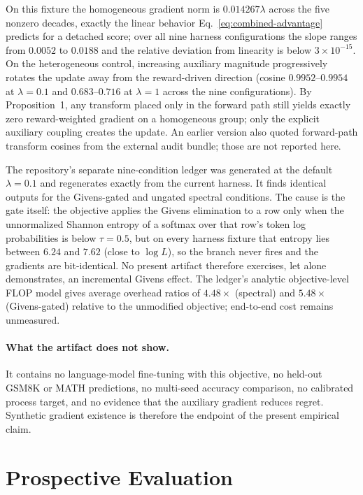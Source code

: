 \documentclass{article}
\begin{document}
On this fixture the homogeneous gradient norm is $0.014267\lambda$ across the
five nonzero decades, exactly the linear behavior
Eq.~\eqref{eq:combined-advantage} predicts for a detached score; over all nine
harness configurations the slope ranges from $0.0052$ to $0.0188$ and the
relative deviation from linearity is below $3\times10^{-15}$.  On the
heterogeneous control, increasing auxiliary magnitude progressively rotates
the update away from the reward-driven direction (cosine $0.9952$--$0.9954$ at
$\lambda=0.1$ and $0.683$--$0.716$ at $\lambda=1$ across the nine
configurations).  By Proposition~1, any transform placed only in the forward
path still yields exactly zero reward-weighted gradient on a homogeneous group;
only the explicit auxiliary coupling creates the update.  An earlier version
also quoted forward-path transform cosines from the external audit bundle;
those are not reported here.

The repository's separate nine-condition ledger was generated at the default
$\lambda=0.1$ and regenerates exactly from the current harness.  It finds
identical outputs for the Givens-gated and ungated spectral conditions.  The
cause is the gate itself: the objective applies the Givens elimination to a row
only when the unnormalized Shannon entropy of a softmax over that row's token
log probabilities is below $\tau=0.5$, but on every harness fixture that
entropy lies between $6.24$ and $7.62$ (close to $\log L$), so the branch
never fires and the gradients are bit-identical.  No present artifact
therefore exercises, let alone demonstrates, an incremental Givens effect.
The ledger's analytic objective-level FLOP model gives average overhead ratios
of $4.48\times$ (spectral) and $5.48\times$ (Givens-gated) relative to the
unmodified objective; end-to-end cost remains unmeasured.

\paragraph{What the artifact does not show.}
It contains no language-model fine-tuning with this objective, no held-out
GSM8K or MATH predictions, no multi-seed accuracy comparison, no calibrated
process target, and no evidence that the auxiliary gradient reduces regret.
Synthetic gradient existence is therefore the endpoint of the present
empirical claim.

\section{Prospective Evaluation}
\end{document}
